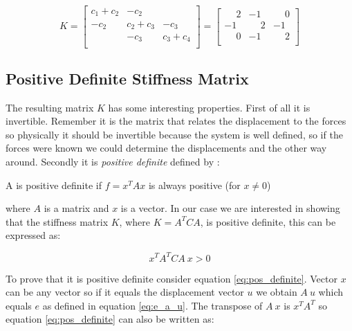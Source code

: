 \begin{equation*}
K =
\begin{bmatrix}
 c_1 + c_2 & -c_2       &            \\
      -c_2 &  c_2 + c_3 &       -c_3 \\
           &       -c_3 &  c_3 + c_4 \\
\end{bmatrix}
= 
\begin{bmatrix}
 \phantom{-}2 &           -1 & \phantom{-}0 \\
           -1 & \phantom{-}2 &           -1 \\
 \phantom{-}0 &           -1 & \phantom{-}2 \\
\end{bmatrix}
\end{equation*}

\subsection{Positive Definite Stiffness Matrix}
The resulting matrix $K$ has some interesting properties. First of all it
is invertible. Remember it is the matrix that relates the displacement
to the forces so physically it should be invertible because the system is well
defined, so if the forces were known we could determine the
displacements and the other way around. Secondly it is \textit{positive
definite} defined by :

\begin{definition}
A is positive definite if $f = x^T A x$ is always positive (for $x \neq 0$) 
\end{definition}

where $A$ is a matrix and $x$ is a vector. In our case we are interested in showing
that the stiffness matrix $K$, where $K = A^T C A$, is positive
definite, this can be expressed as: 

\begin{equation}
\label{eq:pos_definite}
x^T A^T C A \ x > 0 
\end{equation}

To prove that it is positive
definite consider equation \eqref{eq:pos_definite}. Vector $x$ can be
any vector so if it equals the displacement vector $u$ we obtain $A
\ u$ which equals $e$ as defined in equation \eqref{eq:e_a_u}.  
The transpose of $A \ x$ is $x^T A^T$ so equation
\eqref{eq:pos_definite} can also be written as:

